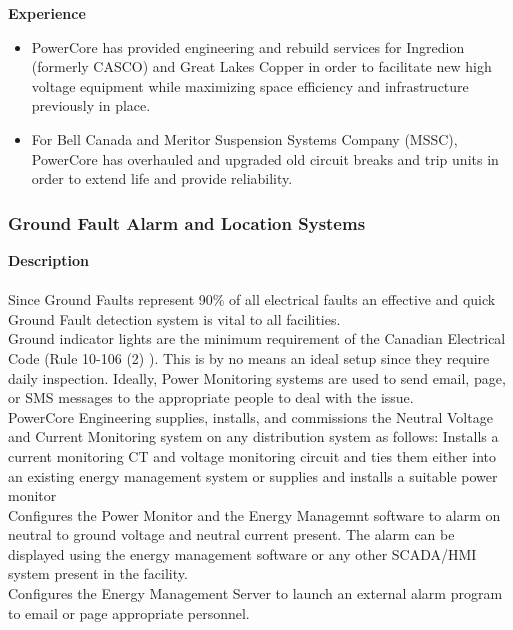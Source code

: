 \textbf{Experience}\\
\begin{itemize}
	\item PowerCore has provided engineering and rebuild services for Ingredion (formerly CASCO) and Great Lakes Copper in order to facilitate new high voltage equipment while maximizing space efficiency and infrastructure previously in place.
	\item For Bell Canada and Meritor Suspension Systems Company (MSSC), PowerCore has overhauled and upgraded old circuit breaks and trip units in order to extend life and provide reliability. 
\end{itemize}

\subsubsection{Ground Fault Alarm and Location Systems}
\label{Sub:Exp:SR}

\textbf{Description}\\
\\
Since Ground Faults represent 90\% of all electrical faults an effective and quick Ground Fault detection system is vital to all facilities. \\

Ground indicator lights are the minimum requirement of the Canadian Electrical Code (Rule 10-106 (2) ). This is by no means an ideal setup since they require daily inspection. Ideally, Power Monitoring systems are used to send email, page, or SMS messages to the appropriate people to deal with the issue. \\

PowerCore Engineering supplies, installs, and commissions the Neutral Voltage and Current Monitoring system on any distribution system as follows: 
Installs a current monitoring CT and voltage monitoring circuit and ties them either into an existing energy management system or supplies and installs a suitable power monitor\\


Configures the Power Monitor and the Energy Managemnt software to alarm on neutral to ground voltage and neutral current present. The alarm can be displayed using the energy management software or any other SCADA/HMI system present in the facility.\\

Configures the Energy Management Server to launch an external alarm program to email or page appropriate personnel.\\


